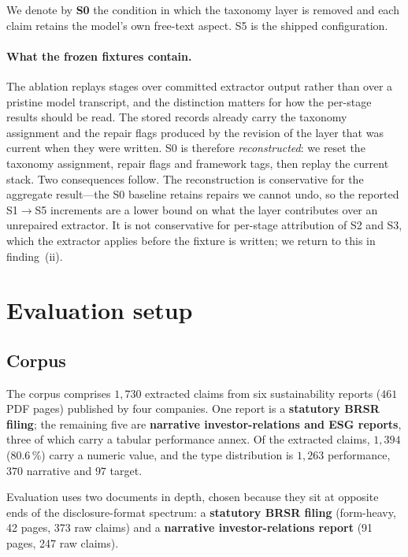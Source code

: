 \documentclass[3p,times]{elsarticle}
\begin{document}
We denote by \textbf{S0} the condition in which the taxonomy layer is removed and
each claim retains the model's own free-text aspect. S5 is the shipped
configuration.

\paragraph{What the frozen fixtures contain.} The ablation replays stages over
committed extractor output rather than over a pristine model transcript, and the
distinction matters for how the per-stage results should be read. The stored
records already carry the taxonomy assignment and the repair flags produced by
the revision of the layer that was current when they were written. S0 is
therefore \emph{reconstructed}: we reset the taxonomy assignment, repair flags and
framework tags, then replay the current stack. Two consequences follow. The
reconstruction is conservative for the aggregate result---the S0 baseline retains
repairs we cannot undo, so the reported S1$\to$S5 increments are a lower bound on
what the layer contributes over an unrepaired extractor. It is not conservative
for per-stage attribution of S2 and S3, which the extractor applies before the
fixture is written; we return to this in finding~(ii).

\section{Evaluation setup}

\subsection{Corpus}

The corpus comprises $1{,}730$ extracted claims from six sustainability reports
($461$ PDF pages) published by four companies. One report is a
\textbf{statutory BRSR filing}; the remaining five are \textbf{narrative
investor-relations and ESG reports}, three of which carry a tabular performance
annex. Of the extracted claims, $1{,}394$ ($80.6\,\%$) carry a numeric value, and
the type distribution is $1{,}263$ performance, $370$ narrative and $97$ target.

Evaluation uses two documents in depth, chosen because they sit at opposite ends
of the disclosure-format spectrum: a \textbf{statutory BRSR filing} (form-heavy,
42 pages, 373 raw claims) and a \textbf{narrative investor-relations report}
(91 pages, 247 raw claims).
\end{document}
